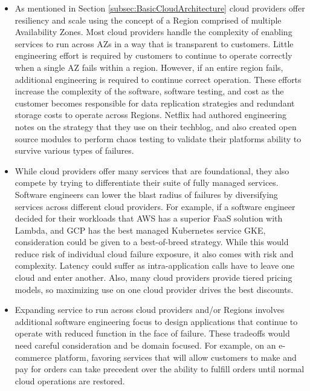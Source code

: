 \documentclass[conference]{IEEEtran}
\begin{document}
\begin{itemize}
	\item As mentioned in Section \ref{subsec:BasicCloudArchitecture} cloud providers offer resiliency and scale using the concept of a Region comprised of multiple Availability Zones.  Most cloud providers handle the complexity of enabling services to run across AZs in a way that is transparent to customers.  Little engineering effort is required by customers to continue to operate correctly when a single AZ fails within a region.  However, if an entire region fails, additional engineering is required to continue correct operation. These efforts increase the complexity of the software, software testing, and cost as the customer becomes responsible for data replication strategies and redundant storage costs to operate across Regions. Netflix had authored engineering notes on the strategy that they use on their techblog\cite{NetflixMultiRegion}, and also created open source modules to perform chaos testing to validate their platforms ability to survive various types of failures. 
	
	\item While cloud providers offer many services that are foundational, they also compete by trying to differentiate their suite of fully managed services.  Software engineers can lower the blast radius of failures by diversifying services across different cloud providers.  For example, if a software engineer decided for their workloads that AWS has a superior FaaS solution with Lambda, and GCP has the best managed Kubernetes service GKE, consideration could be given to a best-of-breed strategy.  While this would reduce risk of individual cloud failure exposure, it also comes with risk and complexity.  Latency could suffer as intra-application calls have to leave one cloud and enter another.  Also, many cloud providers provide tiered pricing models, so maximizing use on one cloud provider drives the best discounts.  
	
	\item Expanding service to run across cloud providers and/or Regions involves additional software engineering focus to design applications that continue to operate with reduced function in the face of failure.  These tradeoffs would need careful consideration and be domain focused.  For example, on an e-commerce platform, favoring services that will allow customers to make and pay for orders can take precedent over the ability to fulfill orders until normal cloud operations are restored. 
	

\end{itemize}
\end{document}
